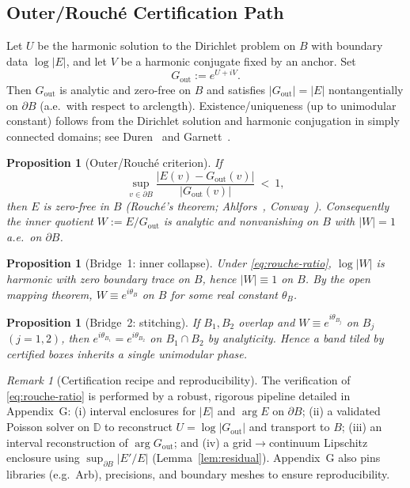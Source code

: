 \documentclass[11pt]{article}
\numberwithin{equation}{section}
\newtheorem{proposition}[theorem]{Proposition}
\theoremstyle{remark}
\newtheorem{remark}[theorem]{Remark}
\newcommand{\D}{\mathbb{D}}
\newcommand{\Gout}{G_{\mathrm{out}}}
\begin{document}
\subsection{Outer/Rouch\'e Certification Path}\label{subsec:rouche-criterion}

Let $U$ be the harmonic solution to the Dirichlet problem on $B$ with boundary data $\log|E|$, and let $V$ be a harmonic conjugate fixed by an anchor. Set
\[
\Gout:=e^{U+iV}.
\]
Then $\Gout$ is analytic and zero-free on $B$ and satisfies $|\Gout|=|E|$ nontangentially on $\partial B$ (a.e.\ with respect to arclength). Existence/uniqueness (up to unimodular constant) follows from the Dirichlet solution and harmonic conjugation in simply connected domains; see Duren~\cite[§II.5]{DurenHp} and Garnett~\cite[§II.2]{GarnettBAF}.

\begin{proposition}[Outer/Rouch\'e criterion]\label{prop:rouche-criterion}
If
\begin{equation}\label{eq:rouche-ratio}
\sup_{v\in\partial B}\frac{|E(v)-\Gout(v)|}{|\Gout(v)|}\ <\ 1,
\end{equation}
then $E$ is zero-free in $B$ (Rouch\'e's theorem; Ahlfors~\cite[§§5--6]{Ahlfors}, Conway~\cite[Ch.~VI]{Conway}). Consequently the inner quotient $W:=E/\Gout$ is analytic and nonvanishing on $B$ with $|W|=1$ a.e.\ on $\partial B$.
\end{proposition}

\begin{proposition}[Bridge~1: inner collapse]\label{prop:bridge1}
Under \eqref{eq:rouche-ratio}, $\log|W|$ is harmonic with zero boundary trace on $B$, hence $|W|\equiv 1$ on $B$. By the open mapping theorem, $W\equiv e^{i\theta_B}$ on $B$ for some real constant $\theta_B$.
\end{proposition}

\begin{proposition}[Bridge~2: stitching]\label{prop:bridge2}
If $B_1,B_2$ overlap and $W\equiv e^{i\theta_{B_j}}$ on $B_j$ $(j=1,2)$, then $e^{i\theta_{B_1}}=e^{i\theta_{B_2}}$ on $B_1\cap B_2$ by analyticity. Hence a band tiled by certified boxes inherits a single unimodular phase.
\end{proposition}

\begin{remark}[Certification recipe and reproducibility]
The verification of \eqref{eq:rouche-ratio} is performed by a robust, rigorous pipeline detailed in Appendix~G: (i) interval enclosures for $|E|$ and $\arg E$ on $\partial B$; (ii) a validated Poisson solver on $\D$ to reconstruct $U=\log|\Gout|$ and transport to $B$; (iii) an interval reconstruction of $\arg\Gout$; and (iv) a grid$\to$continuum Lipschitz enclosure using $\sup_{\partial B}|E'/E|$ (Lemma~\ref{lem:residual}). Appendix~G also pins libraries (e.g.\ Arb), precisions, and boundary meshes to ensure reproducibility. %
\end{remark}
\end{document}
